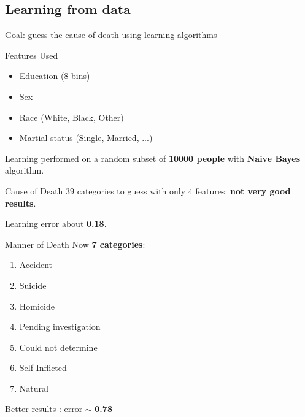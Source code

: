 \documentclass[xcolor=table]{beamer}
\begin{document}
\subsection{Learning from data}
\begin{frame}
  Goal: guess the cause of death using learning algorithms
\end{frame}

\begin{frame}{Features Used}
\begin{itemize}
  \item Education (8 bins)
  \item Sex
  \item Race (White, Black, Other)
  \item Martial status (Single, Married, ...)
\end{itemize}

\bigskip

Learning performed on a random subset of \textbf{10000 people} with \textbf{Naive Bayes} algorithm.
\end{frame}



\begin{frame}{Cause of Death}
  39 categories to guess with only 4 features: \textbf{not very good results}.
  
  \bigskip
  
  Learning error about \textbf{0.18}.
\end{frame}

\begin{frame}{Manner of Death}
  Now \textbf{7 categories}:
  \begin{enumerate}
    \item Accident
    \item Suicide
    \item Homicide
    \item Pending investigation
    \item Could not determine
    \item Self-Inflicted
    \item Natural
  \end{enumerate}
  
  \bigskip
  
  Better results : error $\sim$ \textbf{0.78}
\end{frame}
\end{document}
